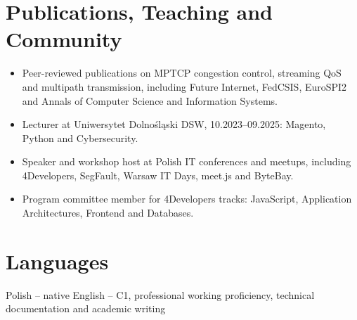 \documentclass[10pt,a4paper]{article}
\begin{document}
\section{Publications, Teaching and Community}

\begin{itemize}
  \item Peer-reviewed publications on MPTCP congestion control, streaming QoS and multipath transmission, including Future Internet, FedCSIS, EuroSPI2 and Annals of Computer Science and Information Systems.
  \item Lecturer at Uniwersytet Dolnośląski DSW, 10.2023--09.2025: Magento, Python and Cybersecurity.
  \item Speaker and workshop host at Polish IT conferences and meetups, including 4Developers, SegFault, Warsaw IT Days, meet.js and ByteBay.
  \item Program committee member for 4Developers tracks: JavaScript, Application Architectures, Frontend and Databases.
\end{itemize}

\section{Languages}

Polish -- native \textbullet{} English -- C1, professional working proficiency, technical documentation and academic writing
\end{document}
